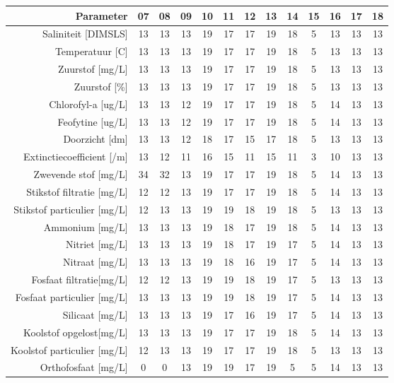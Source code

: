 \begin{tabular}{ r |c | c | c | c | c |c | c | c | c | c | c | c } 
\rowcolor[HTML]{EFEFEF}  
 Parameter & 07 & 08 & 09 & 10 & 11 & 12 & 13 & 14 & 15 & 16 & 17 & 18 \\    \hline     
Saliniteit [DIMSLS] &13 & 13 & 13 & 19 & 17 & 17 & 19 & 18 & 5 & 13 & 13 & 13 \\
Temperatuur [C] &13 & 13 & 13 & 19 & 17 & 17 & 19 & 18 & 5 & 13 & 13 & 13 \\
Zuurstof [mg/L] &13 & 13 & 13 & 19 & 17 & 17 & 19 & 18 & 5 & 13 & 13 & 13 \\
Zuurstof [\%] &13 & 13 & 13 & 19 & 17 & 17 & 19 & 18 & 5 & 13 & 13 & 13 \\
Chlorofyl-a [ug/L] &13 & 13 & 12 & 19 & 17 & 17 & 19 & 18 & 5 & 14 & 13 & 13 \\
Feofytine [ug/L] &13 & 13 & 12 & 19 & 17 & 17 & 19 & 18 & 5 & 14 & 13 & 13 \\
Doorzicht [dm] &13 & 13 & 12 & 18 & 17 & 15 & 17 & 18 & 5 & 13 & 13 & 13 \\
Extinctiecoefficient [/m] &13 & 12 & 11 & 16 & 15 & 11 & 15 & 11 & 3 & 10 & 13 & 13 \\
Zwevende stof [mg/L] &34 & 32 & 13 & 19 & 17 & 17 & 19 & 18 & 5 & 14 & 13 & 13 \\
Stikstof filtratie [mg/L] &12 & 12 & 13 & 19 & 17 & 17 & 19 & 18 & 5 & 14 & 13 & 13 \\
Stikstof particulier [mg/L] &12 & 13 & 13 & 19 & 19 & 18 & 19 & 18 & 5 & 13 & 13 & 13 \\
Ammonium [mg/L] &13 & 13 & 13 & 19 & 18 & 17 & 19 & 18 & 5 & 14 & 13 & 13 \\
Nitriet [mg/L] &13 & 13 & 13 & 19 & 18 & 17 & 19 & 17 & 5 & 14 & 13 & 13 \\
Nitraat [mg/L] &13 & 13 & 13 & 19 & 18 & 16 & 19 & 17 & 5 & 14 & 13 & 13 \\
Fosfaat filtratie[mg/L] &12 & 12 & 13 & 19 & 19 & 18 & 19 & 17 & 5 & 13 & 13 & 13 \\
Fosfaat particulier [mg/L] &13 & 13 & 13 & 19 & 19 & 18 & 19 & 17 & 5 & 14 & 13 & 13 \\
Silicaat [mg/L] &13 & 13 & 13 & 19 & 17 & 16 & 19 & 17 & 5 & 14 & 13 & 13 \\
Koolstof opgelost[mg/L] &13 & 13 & 13 & 19 & 17 & 17 & 19 & 18 & 5 & 14 & 13 & 13 \\
Koolstof particulier [mg/L] &12 & 13 & 13 & 19 & 17 & 17 & 19 & 18 & 5 & 13 & 13 & 13 \\
Orthofosfaat [mg/L] &0 & 0 & 13 & 19 & 19 & 17 & 19 & 5 & 5 & 14 & 13 & 13 \\

\end{tabular}
